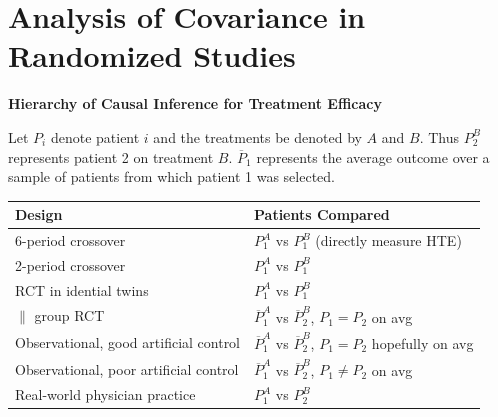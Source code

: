 

\def\apacue{1}
\chapter{Analysis of Covariance in Randomized Studies}

{\smaller[-1] \textbf{Hierarchy of Causal Inference for Treatment Efficacy}}

\bigskip

Let $P_{i}$ denote patient $i$ and the treatments be denoted by $A$
and $B$.  Thus $P_{2}^{B}$ represents patient 2 on treatment $B$.
$\overline{P}_{1}$ represents the average outcome over a sample of
patients from which patient 1 was selected.

\medskip

\begin{tabular}{ll}
\textbf{Design} & \textbf{Patients Compared} \\ \hline
6-period crossover & $P_{1}^{A}$ vs $P_{1}^{B}$ (directly measure HTE)\\
2-period crossover & $P_{1}^{A}$ vs $P_{1}^{B}$ \\
RCT in idential twins & $P_{1}^{A}$ vs $P_{1}^{B}$ \\
$\parallel$ group RCT & $\overline{P}_{1}^{A}$ vs $\overline{P}_{2}^{B}$, 
$P_{1}=P_{2}$ on avg \\
Observational, good artificial control & $\overline{P}_{1}^{A}$ vs 
$\overline{P}_{2}^{B}$, $P_{1}=P_{2}$ hopefully on avg\\
Observational, poor artificial control & $\overline{P}_{1}^{A}$ vs 
$\overline{P}_{2}^{B}$, $P_{1}\neq P_{2}$ on avg\\
Real-world physician practice & $P_{1}^{A}$ vs $P_{2}^{B}$ \\
 \hline
\end{tabular}


